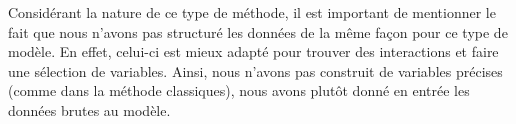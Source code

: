 Considérant la nature de ce type de méthode, il est important de mentionner le fait que nous n'avons pas structuré les données de la même façon pour ce type de modèle. En effet, celui-ci est mieux adapté pour trouver des interactions et faire une sélection de variables. Ainsi, nous n'avons pas construit de variables précises (comme dans la méthode classiques), nous avons plutôt donné en entrée les données brutes au modèle.

